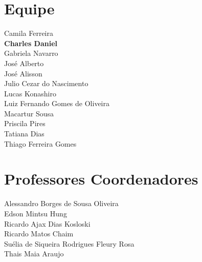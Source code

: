 \begin{center}

\chapter*{Equipe}

Camila Ferreira \\
\textbf{Charles Daniel} \\
Gabriela Navarro \\
José Alberto \\
José Alisson \\
Julio Cezar do Nascimento \\
Lucas Konashiro \\
Luiz Fernando Gomes de Oliveira \\
Macartur Sousa \\
Priscila Pires \\
Tatiana Dias \\
Thiago Ferreira Gomes

\vspace{3cm}

\let\clearpage\relax
\chapter*{Professores Coordenadores}

Alessandro Borges de Sousa Oliveira \\
Edson Mintsu Hung \\
Ricardo Ajax Dias Kosloski \\
Ricardo Matos Chaim  \\
Suélia de Siqueira Rodrigues Fleury Rosa \\
Thais Maia Araujo \\

\end{center}

\newpage
